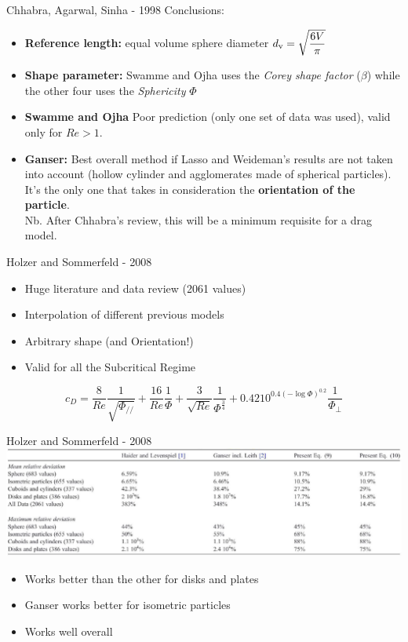 \documentclass[11pt]{beamer}
\begin{document}
	\begin{frame}{Chhabra, Agarwal, Sinha - 1998}
		Conclusions:
		\begin{itemize}
			\item \textbf{Reference length:} equal volume sphere diameter $ d_{\textup{v}} = \sqrt{\dfrac{6 V}{\pi}} $
			\item \textbf{Shape parameter:} Swamme and Ojha uses the \textit{Corey shape factor} ($ \beta $) while the other four uses the \textit{Sphericity} $ \Phi $
			\item \textbf{Swamme and Ojha} Poor prediction (only one set of data was used), valid only for $ Re > 1 $.
			\item \textbf{Ganser:} Best overall method if Lasso and Weideman's results are not taken into account (hollow cylinder and agglomerates made of spherical particles). It's the only one that takes in consideration the \textbf{orientation of the particle}.\\
			Nb. After Chhabra's review, this will be a minimum requisite for a drag model.
		\end{itemize}
	\end{frame}

	\begin{frame}{Holzer and Sommerfeld - 2008}
		\begin{itemize}
			\item Huge literature and data review (2061 values)
			\item Interpolation of different previous models
			\item Arbitrary shape (and Orientation!)
			\item Valid for all the Subcritical Regime
		\end{itemize}
	
		\begin{equation*}
			c_D = \frac{8}{Re} \frac{1}{\sqrt{\Phi_{/\!/}}} + \frac{16}{Re} \frac{1}{\Phi} + \frac{3}{\sqrt{Re}} \frac{1}{\Phi^{\frac{3}{4}}} + 0.4210^{0.4(-\log \Phi)^{0.2}} \frac{1}{\Phi_{\perp}}
		\end{equation*}
	\end{frame}

	\begin{frame}{Holzer and Sommerfeld - 2008}
		\includegraphics[width=\linewidth]{ComparisonH&S.png}
		\begin{itemize}
			\item Works better than the other for disks and plates
			\item Ganser works better for isometric particles
			\item Works well overall
		\end{itemize}
	\end{frame}
\end{document}
